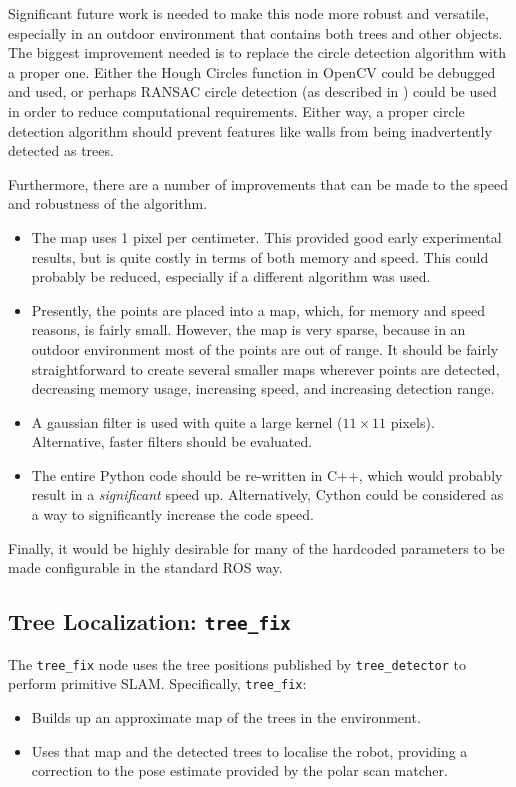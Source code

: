 \documentclass[12pt,oneside,a4paper]{book}
\begin{document}
Significant future work is needed to make this node more robust and
versatile, especially in an outdoor environment that contains both
trees and other objects. The biggest improvement needed is to replace
the circle detection algorithm with a proper one. Either the Hough
Circles function in OpenCV could be debugged and used, or perhaps
RANSAC circle detection (as described in \cite{ransac}) could be
used in order to reduce computational requirements. Either way, a
proper circle detection algorithm should prevent features like walls
from being inadvertently detected as trees.

Furthermore, there are a number of improvements that can be made to
the speed and robustness of the algorithm.
\begin{itemize}
\item The map uses 1 pixel per centimeter. This provided good early
  experimental results, but is quite costly in terms of both memory
  and speed. This could probably be reduced, especially if a different
  algorithm was used.
\item Presently, the points are placed into a map, which, for memory
  and speed reasons, is fairly small. However, the map is very sparse,
  because in an outdoor environment most of the points are out of range.
  It should be fairly straightforward to create several smaller maps
  wherever points are detected, decreasing memory usage, increasing
  speed, and increasing detection range.
\item A gaussian filter is used with quite a large kernel ($11 \times
  11$ pixels). Alternative, faster filters should be evaluated.
\item The entire Python code should be re-written in C++, which would
  probably result in a \emph{significant} speed up. Alternatively,
  Cython could be considered as a way to significantly increase the
  code speed.
\end{itemize}

Finally, it would be highly desirable for many of the hardcoded
parameters to be made configurable in the standard ROS way.
\newpage
\subsection{Tree Localization: \texttt{tree\_fix}}
\label{sec:tree_fix}

The \texttt{tree\_fix} node uses the tree positions published by
\texttt{tree\_detector} to perform primitive SLAM. Specifically, \texttt{tree\_fix}:
\begin{itemize}
\item Builds up an approximate map of the trees in the environment.
\item Uses that map and the detected trees to localise the robot,
  providing a correction to the pose estimate provided by the polar
  scan matcher.
\end{itemize}
\end{document}
